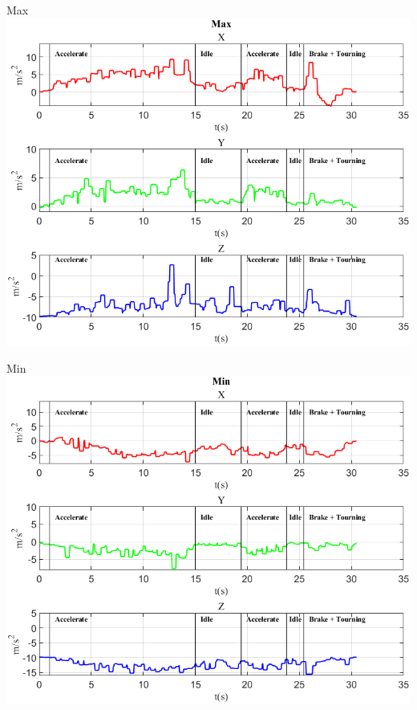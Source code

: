 \documentclass[beamer]{standalone}
\begin{document}
	\begin{frame}{{Max}}
		\centering\includegraphics[height=.8\textheight]{figure/Acc/Max}
	\end{frame}

	\begin{frame}{{Min}}
			\centering\includegraphics[height=.8\textheight]{figure/Acc/Min}
		\end{frame}
	
\end{document}
